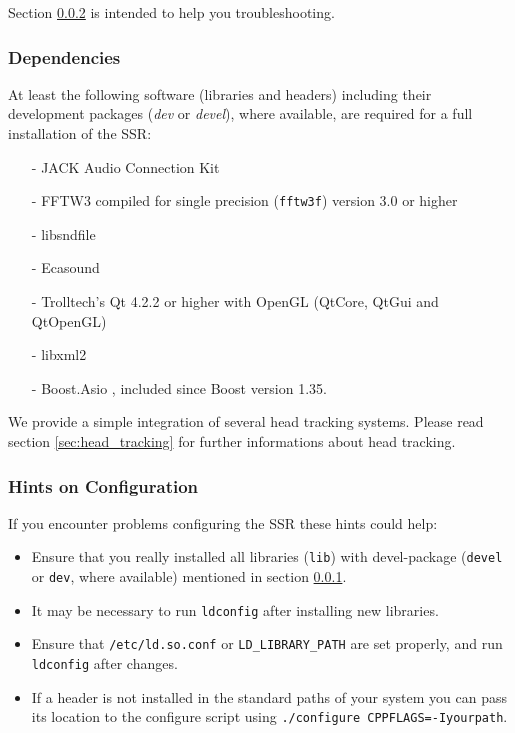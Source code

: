 Section \ref{sec:hints_conf} is intended to help you troubleshooting.

\subsubsection{Dependencies}
\label{sec:dependencies}
At least the following software (libraries and headers) including their
development packages (\emph{dev} or \emph{devel}),
where available, are required for a full installation of the SSR:

\begin{itemize}
\item[-] JACK Audio Connection Kit \cite{jack}
\item[-] FFTW3 compiled for single precision (\texttt{fftw3f}) version 3.0 or higher
  \cite{fftw3}
\item[-] libsndfile \cite{sndfile}
\item[-] Ecasound \cite{ecasound}
\item[-] Trolltech's Qt 4.2.2 or higher with OpenGL (QtCore, QtGui and QtOpenGL)
  \cite{qt4}
\item[-] libxml2 \cite{libxml2}
\item[-] Boost.Asio \cite{boost}, included since Boost version 1.35.
\end{itemize}

We provide a simple integration of several head tracking systems.
Please read section
\ref{sec:head_tracking} for further informations about head tracking.

\subsubsection{Hints on Configuration}
\label{sec:hints_conf}

If you encounter problems configuring the SSR these hints could help:
\begin{itemize}
\item Ensure that you really installed all libraries (\verb+lib+) with devel-package (\verb+devel+ or \verb+dev+, where available) mentioned in section \ref{sec:dependencies}.
\item It may be necessary to run \verb+ldconfig+ after installing new libraries.
\item Ensure that \verb+/etc/ld.so.conf+ or \verb+LD_LIBRARY_PATH+ are set
  properly, and run \verb+ldconfig+ after changes.
\item If a header is not installed in the standard paths of your system you
  can pass its location to the configure script using
  \verb+./configure CPPFLAGS=-Iyourpath+.
\end{itemize}


